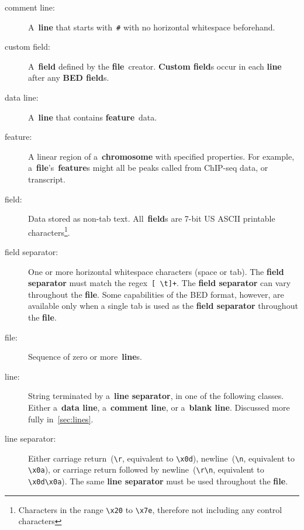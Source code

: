 \documentclass[11pt]{article}
\begin{document}
\begin{description}
\item[comment line:]
  A~\textbf{line} that starts with~\texttt{\#} with no horizontal whitespace beforehand.

\item[custom field:]
  A~\textbf{field} defined by the \textbf{file}~creator.
  \textbf{Custom field}s occur in each \textbf{line} after any \textbf{\acs{BED} field}s.

\item[data line:]
  A~\textbf{line} that contains \textbf{feature}~data.

\item[feature:]
  A linear region of a~\textbf{chromosome} with specified properties.
  For example, a~\textbf{file}'s~\textbf{feature}s might all be peaks called from ChIP-seq data, or transcript.

\item[field:]
  Data stored as non-tab text.
  All~\textbf{field}s are 7-bit US \ac{ASCII} printable characters\footnote{Characters in the range \texttt{{\textbackslash}x20} to \texttt{{\textbackslash}x7e}, therefore not including any control characters}.

\item[field separator:]
  One or more horizontal whitespace characters (space or tab).
  The \textbf{field separator} must match the \ac{regex}~\texttt{[ {\textbackslash}t]+}.
  The \textbf{field separator} can vary throughout the \textbf{file}.
  Some capabilities of the \ac{BED} format, however, are available only when a single tab is used as the \textbf{field separator} throughout the \textbf{file}.

\item[file:]
  Sequence of zero or more~\textbf{line}s.

\item[line:]
  String terminated by a~\textbf{line separator}, in one of the following classes.
  Either a~\textbf{data line}, a~\textbf{comment line}, or a~\textbf{blank line}.
  Discussed more fully in~\autoref{sec:lines}.

\item[line separator:]
  Either carriage return~(\texttt{{\textbackslash}r}, equivalent to \texttt{{\textbackslash}x0d}), newline~(\texttt{{\textbackslash}n}, equivalent to \texttt{{\textbackslash}x0a}), or carriage return followed by newline~(\texttt{{\textbackslash}r{\textbackslash}n}, equivalent to \texttt{{\textbackslash}x0d{\textbackslash}x0a}).
  The same \textbf{line separator} must be used throughout the \textbf{file}.
\end{description}
\end{document}
